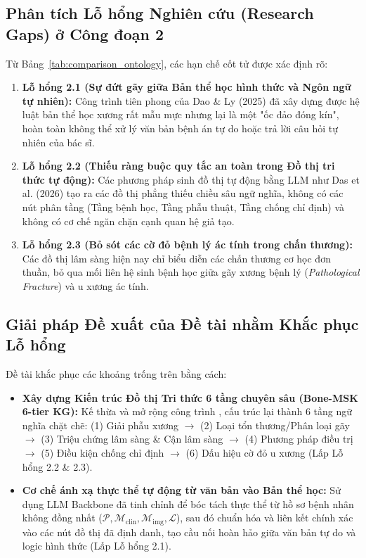\subsection{Phân tích Lỗ hổng Nghiên cứu (Research Gaps) ở Công đoạn 2}
Từ Bảng~\ref{tab:comparison_ontology}, các hạn chế cốt tử được xác định rõ:
\begin{enumerate}
    \item \textbf{Lỗ hổng 2.1 (Sự đứt gãy giữa Bản thể học hình thức và Ngôn ngữ tự nhiên):} Công trình tiên phong của Dao \& Ly (2025) \cite{dao2025ontology} đã xây dựng được hệ luật bản thể học xương rất mẫu mực nhưng lại là một "ốc đảo đóng kín", hoàn toàn không thể xử lý văn bản bệnh án tự do hoặc trả lời câu hỏi tự nhiên của bác sĩ.
    \item \textbf{Lỗ hổng 2.2 (Thiếu ràng buộc quy tắc an toàn trong Đồ thị tri thức tự động):} Các phương pháp sinh đồ thị tự động bằng LLM như Das et al. (2026) \cite{das2025clinicalkg} tạo ra các đồ thị phẳng thiếu chiều sâu ngữ nghĩa, không có các nút phân tầng (Tầng bệnh học, Tầng phẫu thuật, Tầng chống chỉ định) và không có cơ chế ngăn chặn cạnh quan hệ giả tạo.
    \item \textbf{Lỗ hổng 2.3 (Bỏ sót các cờ đỏ bệnh lý ác tính trong chấn thương):} Các đồ thị lâm sàng hiện nay chỉ biểu diễn các chấn thương cơ học đơn thuần, bỏ qua mối liên hệ sinh bệnh học giữa gãy xương bệnh lý (\emph{Pathological Fracture}) và u xương ác tính.
\end{enumerate}

\subsection{Giải pháp Đề xuất của Đề tài nhằm Khắc phục Lỗ hổng}
Đề tài khắc phục các khoảng trống trên bằng cách:
\begin{itemize}
    \item \textbf{Xây dựng Kiến trúc Đồ thị Tri thức 6 tầng chuyên sâu (Bone-MSK 6-tier KG):} Kế thừa và mở rộng công trình \cite{dao2025ontology}, cấu trúc lại thành 6 tầng ngữ nghĩa chặt chẽ: (1) Giải phẫu xương $\rightarrow$ (2) Loại tổn thương/Phân loại gãy $\rightarrow$ (3) Triệu chứng lâm sàng \& Cận lâm sàng $\rightarrow$ (4) Phương pháp điều trị $\rightarrow$ (5) Điều kiện chống chỉ định $\rightarrow$ (6) Dấu hiệu cờ đỏ u xương (Lấp Lỗ hổng 2.2 \& 2.3).
    \item \textbf{Cơ chế ánh xạ thực thể tự động từ văn bản vào Bản thể học:} Sử dụng LLM Backbone đã tinh chỉnh để bóc tách thực thể từ hồ sơ bệnh nhân không đồng nhất ($\mathcal{P}, \mathcal{M}_{\mathrm{clin}}, \mathcal{M}_{\mathrm{img}}, \mathcal{L}$), sau đó chuẩn hóa và liên kết chính xác vào các nút đồ thị đã định danh, tạo cầu nối hoàn hảo giữa văn bản tự do và logic hình thức (Lấp Lỗ hổng 2.1).
\end{itemize}

